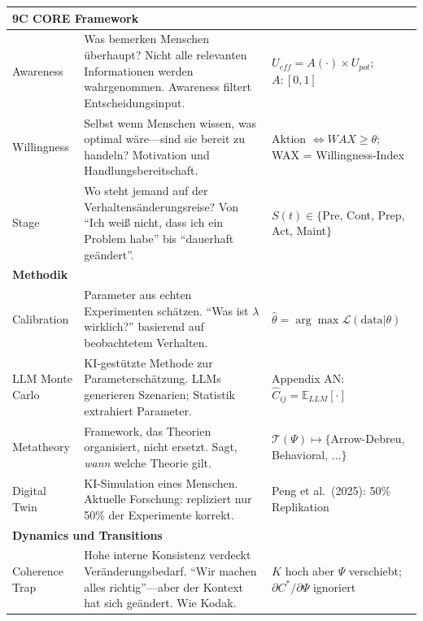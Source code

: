 \begin{center}
\begin{longtable}{@{}p{2.5cm}p{5.2cm}p{5.2cm}@{}}
\midrule
\multicolumn{3}{l}{\cellcolor{red!10}\textbf{9C CORE Framework}} \\
\midrule

Awareness &
Was bemerken Menschen überhaupt? Nicht alle relevanten Informationen werden wahrgenommen. Awareness filtert Entscheidungsinput. &
$U_{eff} = A(\cdot) \times U_{pot}$; \newline $A: [0,1]$ \\

Willingness &
Selbst wenn Menschen wissen, was optimal wäre---sind sie bereit zu handeln? Motivation und Handlungsbereitschaft. &
Aktion $\Leftrightarrow WAX \geq \theta$; \newline WAX = Willingness-Index \\

Stage &
Wo steht jemand auf der Verhaltensänderungsreise? Von ``Ich weiß nicht, dass ich ein Problem habe'' bis ``dauerhaft geändert''. &
$S(t) \in \{$Pre, Cont, Prep, Act, Maint$\}$ \\

\midrule
\multicolumn{3}{l}{\cellcolor{purple!10}\textbf{Methodik}} \\
\midrule

Calibration &
Parameter aus echten Experimenten schätzen. ``Was ist $\lambda$ wirklich?'' basierend auf beobachtetem Verhalten. &
$\hat{\theta} = \arg\max \mathcal{L}(\text{data}|\theta)$ \\

LLM Monte Carlo &
KI-gestützte Methode zur Parameterschätzung. LLMs generieren Szenarien; Statistik extrahiert Parameter. &
Appendix AN: $\hat{C}_{ij} = \mathbb{E}_{LLM}[\cdot]$ \\

Metatheory &
Framework, das Theorien organisiert, nicht ersetzt. Sagt, \emph{wann} welche Theorie gilt. &
$\mathcal{T}(\Psi) \mapsto \{$Arrow-Debreu, Behavioral, ...$\}$ \\

Digital Twin &
KI-Simulation eines Menschen. Aktuelle Forschung: repliziert nur 50\% der Experimente korrekt. &
Peng et al.\ (2025): 50\% Replikation \\

\midrule
\multicolumn{3}{l}{\cellcolor{gray!10}\textbf{Dynamics und Transitions}} \\
\midrule

Coherence Trap &
Hohe interne Konsistenz verdeckt Veränderungsbedarf. ``Wir machen alles richtig''---aber der Kontext hat sich geändert. Wie Kodak. &
$K$ hoch aber $\Psi$ verschiebt; \newline $\partial C^*/\partial \Psi$ ignoriert \\


\end{longtable}
\end{center}
